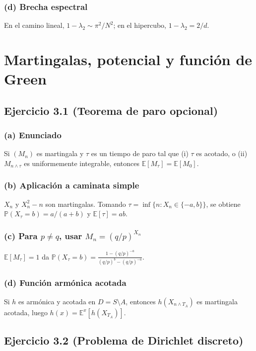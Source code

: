 \documentclass[letterpaper, 12pt]{article}
\newcommand{\E}{\mathbb{E}}
\renewcommand{\P}{\mathbb{P}}
\newcommand{\1}{\mathbbm{1}}
\begin{document}
    \subsubsection*{(d) Brecha espectral}
    En el camino lineal, $1-\lambda_2\sim\pi^2/N^2$; en el hipercubo, $1-\lambda_2=2/d$.

    \section{Martingalas, potencial y funci\'on de Green}

    \subsection{Ejercicio 3.1 (Teorema de paro opcional)}

    \subsubsection*{(a) Enunciado}
    Si $(M_n)$ es martingala y $\tau$ es un tiempo de paro tal que (i) $\tau$ es acotado, o (ii) $M_{n\wedge\tau}$ es uniformemente integrable, entonces $\E[M_\tau]=\E[M_0]$.

    \subsubsection*{(b) Aplicaci\'on a caminata simple}
    $X_n$ y $X_n^2-n$ son martingalas. Tomando $\tau=\inf\{n:X_n\in\{-a,b\}\}$, se obtiene $\P(X_\tau=b)=a/(a+b)$ y $\E[\tau]=ab$.

    \subsubsection*{(c) Para $p\neq q$, usar $M_n=(q/p)^{X_n}$}
    $\E[M_\tau]=1$ da $\P(X_\tau=b)=\frac{1-(q/p)^{-a}}{(q/p)^b-(q/p)^{-a}}$.

    \subsubsection*{(d) Funci\'on arm\'onica acotada}
    Si $h$ es arm\'onica y acotada en $D=S\setminus A$, entonces $h(X_{n\wedge T_A})$ es martingala acotada, luego $h(x)=\E^x[h(X_{T_A})]$.

    \subsection{Ejercicio 3.2 (Problema de Dirichlet discreto)}
\end{document}
